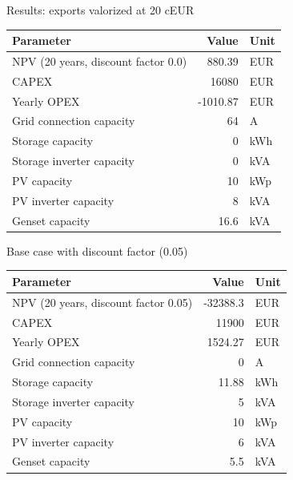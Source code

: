 \begin{frame}{Results: exports valorized at 20 cEUR}
\begin{tabular}{lrl}
\hline
 Parameter                           &    Value & Unit   \\
\hline
 NPV (20 years, discount factor 0.0) &   880.39 & EUR    \\
 CAPEX                               &    16080 & EUR    \\
 Yearly OPEX                         & -1010.87 & EUR    \\
 Grid connection capacity            &       64 & A      \\
 Storage capacity                    &        0 & kWh    \\
 Storage inverter capacity           &        0 & kVA    \\
 PV capacity                         &       10 & kWp    \\
 PV inverter capacity                &        8 & kVA    \\
 Genset capacity                     &     16.6 & kVA    \\
\hline
\end{tabular}
\end{frame}

\begin{frame}{Base case with discount factor (0.05)}
\begin{tabular}{lrl}
\hline
 Parameter                            &    Value & Unit   \\
\hline
 NPV (20 years, discount factor 0.05) & -32388.3 & EUR    \\
 CAPEX                                &    11900 & EUR    \\
 Yearly OPEX                          &  1524.27 & EUR    \\
 Grid connection capacity             &        0 & A      \\
 Storage capacity                     &    11.88 & kWh    \\
 Storage inverter capacity            &        5 & kVA    \\
 PV capacity                          &       10 & kWp    \\
 PV inverter capacity                 &        6 & kVA    \\
 Genset capacity                      &      5.5 & kVA    \\
\hline
\end{tabular}
\end{frame}


